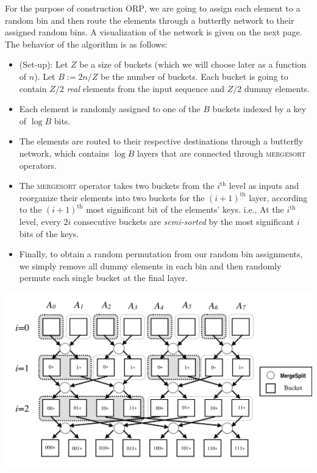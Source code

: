 For the purpose of construction \textsc{ORP}, we are going to assign each element to a random bin and then route the elements through a butterfly network to their assigned random bins. A visualization of the network is given on the next page. The behavior of the algorithm is as follows:
\begin{itemize}
    \item (Set-up): Let $Z$ be a size of buckets (which we will choose later as a function of $n$). Let $B := 2n/Z$ be the number of buckets. Each bucket is going to contain $Z/2$ \emph{real} elements from the input sequence and $Z/2$ dummy elements.

    \item Each element is randomly  assigned to one of the $B$ buckets indexed by a key of  $\log B$ bits.

    \item The elements are routed to their respective destinations through a butterfly network, which contains $\log B$ layers that are connected through \textsc{mergesort} operators.

    \item The \textsc{mergesort} operator takes two buckets from the $i^{\text{th}}$ level as inputs and reorganize their elements into two buckets for  the $(i+1)^{\text{th}}$ layer, according to the $(i+1)^{\text{th}}$ most significant bit of the elements' keys. i.e., At the $i^{\text{th}}$ level, every $2i$ consecutive buckets are \emph{semi-sorted} by the most significant $i$ bits of the keys.

    \item Finally, to obtain a random permutation from our random bin assignments, we  simply remove  all  dummy  elements in each bin and then randomly permute each single bucket at the final layer. 
\end{itemize}

\includegraphics[scale=0.45]{fig2.png}


